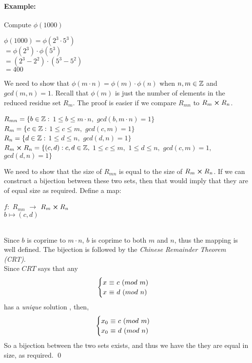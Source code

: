 \documentclass[../main.tex]{subfiles}
\begin{document}
\paragraph{Example:}
Compute $\phi(1000)$
\begin{center}
    $\phi(1000)=\phi(2^3 \cdot 5^3)$ \\
    $=\phi(2^3) \cdot \phi(5^3)$ \\
    $=(2^3-2^2) \cdot (5^3-5^2)$ \\
    $=400$
\end{center}
\begin{pf}
    We need to show that $\phi(m \cdot n)=\phi(m) \cdot \phi(n)$ when $n,m \in \mathbb{Z}$ and $gcd(m,n)=1$. Recall that $\phi(m)$ is just the number of elements in the reduced residue set $R_m$. The proof is easier if we compare $R_{mn}$ to $R_m \cross R_n$.
    \begin{center}
        $R_{mn}=\{b \in \mathbb{Z}:$ $1 \leq b \leq m \cdot n,$ $gcd(b, m \cdot n)=1\}$ \\
        $R_{m}=\{c \in \mathbb{Z}:$ $1 \leq c \leq m,$ $gcd(c, m)=1\}$ \\
        $R_{n}=\{d \in \mathbb{Z}:$ $1 \leq d \leq n,$ $gcd(d,n)=1\}$ \\
        $R_m \cross R_n=\{(c,d): c,d \in \mathbb{Z},$ $1 \leq c \leq m,$ $1 \leq d \leq n,$ $gcd(c,m)=1,$ $gcd(d,n)=1\}$
    \end{center}
    We need to show that the size of $R_{mn}$ is equal to the size of $R_m \cross R_n$. If we can construct a bijection between these two sets, then that would imply that they are of equal size as required.
    \sspace
    Define a map:
    \begin{center}
        $f:$ $R_{mn}$ $\xrightarrow{}$ $R_m \cross R_n$ \\
        $b \mapsto (c,d)$ \\
         \\
    \end{center}
\end{pf}
\begin{pf}
    Since $b$ is coprime to $m\cdot n$, $b$ is coprime to both $m$ and $n$, thus the mapping is well defined. The bijection is followed by the \textit{Chinese Remainder Theorem (CRT)}. \\
    Since $CRT$ says that any
    \[\begin{cases} 
      $\nmod{x}{c}{m}$ \\
      $\nmod{x}{d}{n}$
   \end{cases}\]
   has a \textit{unique} solution , then,
   \[\begin{cases} 
      $\nmod{x_0}{c}{m}$ \\
      $\nmod{x_0}{d}{n}$
   \end{cases}\]
   So a bijection between the two sets exists, and thus we have the they are equal in size, as required. \qed
\end{pf}
\end{document}
